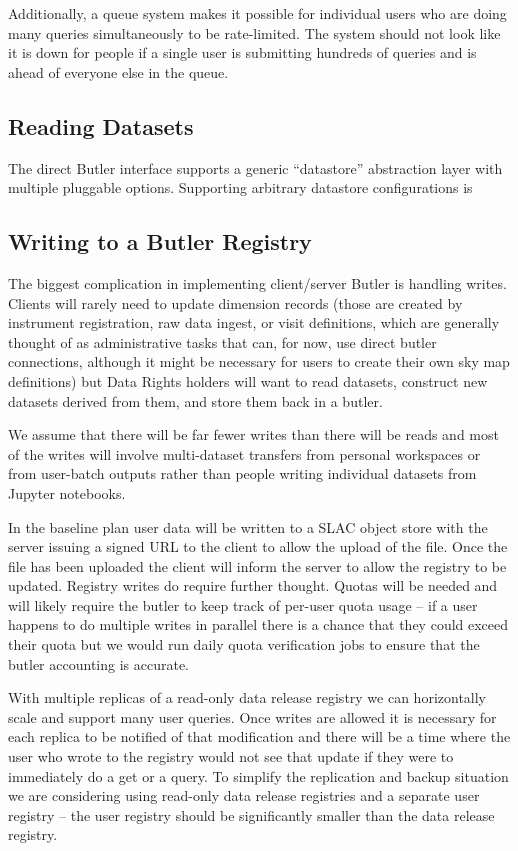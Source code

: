 Additionally, a queue system makes it possible for individual users who are doing many queries simultaneously to be rate-limited.
The system should not look like it is down for people if a single user is submitting hundreds of queries and is ahead of everyone else in the queue.

\subsection{Reading Datasets}

The direct Butler interface supports a generic ``datastore'' abstraction layer with multiple pluggable options.
Supporting arbitrary datastore configurations is

\subsection{Writing to a Butler Registry}

The biggest complication in implementing client/server Butler is handling writes.
Clients will rarely need to update dimension records (those are created by instrument registration, raw data ingest, or visit definitions, which are generally thought of as administrative tasks that can, for now, use direct butler connections, although it might be necessary for users to create their own sky map definitions) but Data Rights holders will want to read datasets, construct new datasets derived from them, and store them back in a butler.

We assume that there will be far fewer writes than there will be reads and most of the writes will involve multi-dataset transfers from personal workspaces or from user-batch outputs \cite{DMTN-223} rather than people writing individual datasets from Jupyter notebooks.

In the baseline plan user data will be written to a SLAC object store with the server issuing a signed URL to the client to allow the upload of the file.
Once the file has been uploaded the client will inform the server to allow the registry to be updated.
Registry writes do require further thought.
Quotas will be needed and will likely require the butler to keep track of per-user quota usage -- if a user happens to do multiple writes in parallel there is a chance that they could exceed their quota but we would run daily quota verification jobs to ensure that the butler accounting is accurate.

With multiple replicas of a read-only data release registry we can horizontally scale and support many user queries.
Once writes are allowed it is necessary for each replica to be notified of that modification and there will be a time where the user who wrote to the registry would not see that update if they were to immediately do a get or a query.
To simplify the replication and backup situation we are considering using read-only data release registries and a separate user registry -- the user registry should be significantly smaller than the data release registry.

